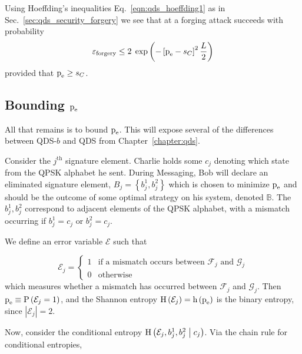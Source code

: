 Using Hoeffding's inequalities Eq.~\ref{eqn:qds_hoeffding1} as in Sec.~\ref{sec:qds_security_forgery} we see that at a forging attack succeeds with probability 
\begin{equation}\label{eqn:aqc_forgery}
\varepsilon_{\text{forgery}} \le 2 \; \exp\left( - \left[ \text{p}_{\text{e}} - s_C\right]^2 \frac{L}{2} \right)
\end{equation}
provided that $\text{p}_{\text{e}} \ge s_C$. 

\subsection{Bounding $\text{p}_{\text{e}}$}
All that remains is to bound $\text{p}_{\text{e}}$. This will expose several of the differences between QDS-$b$ and QDS from Chapter~\ref{chapter:qds}.


Consider the $j^\text{th}$ signature element. Charlie holds some $c_j$ denoting which state from the QPSK alphabet he sent. During Messaging, Bob will declare an eliminated signature element, $B_j = \left\{b_j^1, b_j^2\right\}$ which is chosen to minimize $\text{p}_{\text{e}}$ and should be the outcome of some optimal strategy on his system, denoted $\mathbb{B}$. The $b_j^1, b_j^2$ correspond to adjacent elements of the QPSK alphabet, with a mismatch occurring if $b_j^1 = c_j$ or $b_j^2 = c_j$. %

We define an error variable $\mathcal{E}$ such that 

\begin{equation*}\label{eqn:error}
\mathcal{E}_j = 
\begin{cases}
1 & \text{if a mismatch occurs between $\mathcal{F}_j$ and $\mathcal{G}_j$} \\
0 & \text{otherwise}
\end{cases}
\end{equation*}
which measures whether a mismatch has occurred between $\mathcal{F}_j$ and $\mathcal{G}_j$. Then $\text{p}_{\text{e}} \equiv \text{P}\left(\mathcal{E}_j = 1\right)$, and the Shannon entropy $\text{H}\left(\mathcal{E}_j\right) = \text{h}\left(\text{p}_{\text{e}}\right)$ is the binary entropy, since $\left|\mathcal{E}_j\right| = 2$. 

Now, consider the conditional entropy $\text{H}\left(\mathcal{E}_j, b_j^1, b_j^2 \; \middle| \; c_j\right)$. Via the chain rule for conditional entropies,

